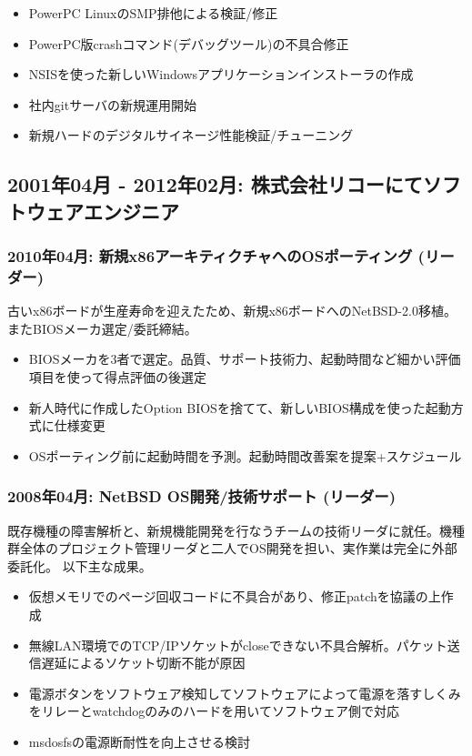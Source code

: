 \documentclass[letterpaper]{article}
\begin{document}
\begin{itemize}
  \item PowerPC LinuxのSMP排他による検証/修正
  \item PowerPC版crashコマンド(デバッグツール)の不具合修正
  \item NSISを使った新しいWindowsアプリケーションインストーラの作成
  \item 社内gitサーバの新規運用開始
  \item 新規ハードのデジタルサイネージ性能検証/チューニング
\end{itemize}

\subsection*{2001年04月 - 2012年02月: 株式会社リコーにてソフトウェアエンジニア}
\subsubsection*{2010年04月: 新規x86アーキティクチャへのOSポーティング (リーダー)}
古いx86ボードが生産寿命を迎えたため、新規x86ボードへのNetBSD-2.0移植。またBIOSメーカ選定/委託締結。

\begin{itemize}
  \item BIOSメーカを3者で選定。品質、サポート技術力、起動時間など細かい評価項目を使って得点評価の後選定
  \item 新人時代に作成したOption BIOSを捨てて、新しいBIOS構成を使った起動方式に仕様変更
  \item OSポーティング前に起動時間を予測。起動時間改善案を提案+スケジュール
\end{itemize}

\subsubsection*{2008年04月: NetBSD OS開発/技術サポート (リーダー)}
既存機種の障害解析と、新規機能開発を行なうチームの技術リーダに就任。機種群全体のプロジェクト管理リーダと二人でOS開発を担い、実作業は完全に外部委託化。
以下主な成果。

\begin{itemize}
  \item 仮想メモリでのページ回収コードに不具合があり、修正patchを協議の上作成
  \item 無線LAN環境でのTCP/IPソケットがcloseできない不具合解析。パケット送信遅延によるソケット切断不能が原因
  \item 電源ボタンをソフトウェア検知してソフトウェアによって電源を落すしくみをリレーとwatchdogのみのハードを用いてソフトウェア側で対応
  \item msdosfsの電源断耐性を向上させる検討
\end{itemize}
\end{document}
